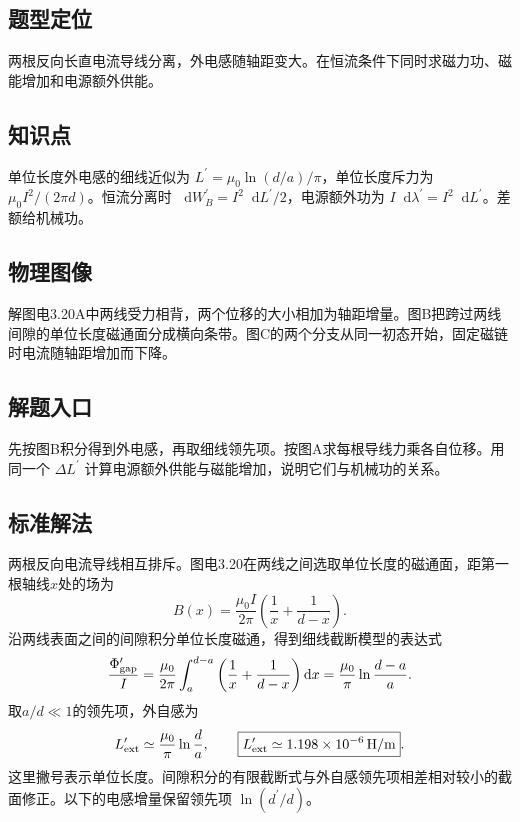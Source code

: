 \documentclass[UTF8,fontset=fandol,a4paper,11pt]{ctexart}
\newcommand{\dd}{\mathop{}\!\mathrm{d}}
\begin{document}


\subsection*{题型定位}

两根反向长直电流导线分离，外电感随轴距变大。在恒流条件下同时求磁力功、磁能增加和电源额外供能。



\subsection*{知识点}

单位长度外电感的细线近似为 $L^\prime=\mu_0\ln(d/a)/\pi$，单位长度斥力为 $\mu_0 I^2/(2\pi d)$。恒流分离时 $\dd W_B^\prime=I^2\dd L^\prime/2$，电源额外功为 $I\dd\lambda^\prime=I^2\dd L^\prime$。差额给机械功。



\subsection*{物理图像}

解图电3.20A中两线受力相背，两个位移的大小相加为轴距增量。图B把跨过两线间隙的单位长度磁通面分成横向条带。图C的两个分支从同一初态开始，固定磁链时电流随轴距增加而下降。



\subsection*{解题入口}

先按图B积分得到外电感，再取细线领先项。按图A求每根导线力乘各自位移。用同一个 $\Delta L^\prime$ 计算电源额外供能与磁能增加，说明它们与机械功的关系。


\subsection*{标准解法}

两根反向电流导线相互排斥。图电3.20在两线之间选取单位长度的磁通面，距第一根轴线$x$处的场为
\[
B(x)=\frac{\mu_0I}{2\pi}\left(\frac1x+\frac1{d-x}\right).
\]
沿两线表面之间的间隙积分单位长度磁通，得到细线截断模型的表达式
\[
\frac{\Phi'_{\rm gap}}I=\frac{\mu_0}{2\pi}\int_a^{d-a}
\left(\frac1x+\frac1{d-x}\right)\dd x
=\frac{\mu_0}{\pi}\ln\frac{d-a}{a}.
\]
取$a/d\ll1$的领先项，外自感为
\[
L'_{\rm ext}\simeq\frac{\mu_0}{\pi}\ln\frac d a,
\qquad
\boxed{L'_{\rm ext}\simeq1.198\times10^{-6}\,\mathrm{H/m}}.
\]
这里撇号表示单位长度。间隙积分的有限截断式与外自感领先项相差相对较小的截面修正。以下的电感增量保留领先项 $\ln(d^\prime/d)$。
\end{document}
